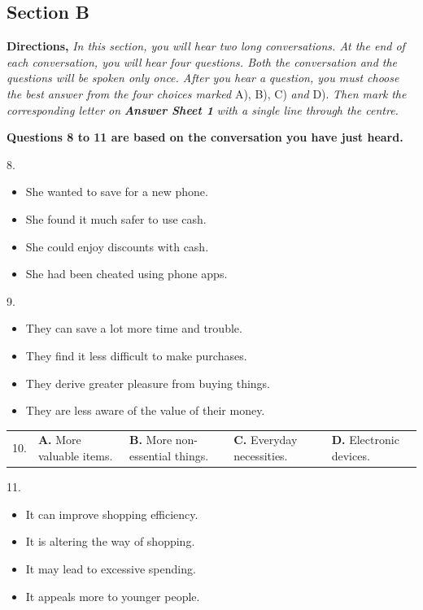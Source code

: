 \documentclass[UTF8,11pt]{ctexart}
\begin{document}
\subsection*{\textbf{Section B}}


\textbf{Directions, }\textit{In this section, you will hear two long conversations. At the end of each conversation, you will} \textit{hear four questions. Both the conversation and the questions will be spoken only once. After you hear a} \textit{question, you must choose the best answer from the four choices marked }A), B), C) \textit{and }D). \textit{Then mark} \textit{the corresponding letter on }\textbf{\textit{Answer Sheet 1 }}\textit{with a single line through the centre.}


\textbf{Questions 8 to 11 are based on the conversation you have just heard.}


8.


\begin{itemize}[leftmargin=2em,itemsep=.2em,topsep=.4em]\item[A.] She wanted to save for a new phone.
\item[B.] She found it much safer to use cash.
\item[C.] She could enjoy discounts with cash.
\item[D.] She had been cheated using phone apps.
\end{itemize}

9.


\begin{itemize}[leftmargin=2em,itemsep=.2em,topsep=.4em]\item[A.] They can save a lot more time and trouble.
\item[B.] They find it less difficult to make purchases.
\item[C.] They derive greater pleasure from buying things.
\item[D.] They are less aware of the value of their money.
\end{itemize}

\noindent\begin{tabularx}{\linewidth}{@{}lXXXX@{}}10. & \textbf{A.} More valuable items. & \textbf{B.} More non-essential things. & \textbf{C.} Everyday necessities. & \textbf{D.} Electronic devices.\\\end{tabularx}\par

11.


\begin{itemize}[leftmargin=2em,itemsep=.2em,topsep=.4em]\item[A.] It can improve shopping efficiency.
\item[B.] It is altering the way of shopping.
\item[C.] It may lead to excessive spending.
\item[D.] It appeals more to younger people.
\end{itemize}
\end{document}
